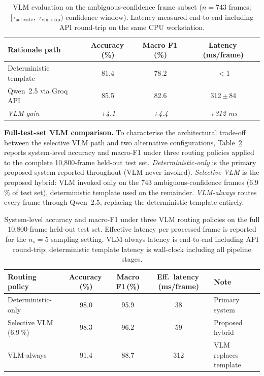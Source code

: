 \documentclass[sensors,article,submit,pdftex,moreauthors]{Definitions/mdpi}
\begin{document}
\begin{table}[H]
\caption{VLM evaluation on the ambiguous-confidence frame subset
($n = 743$ frames; $[\tau_{\text{activate}},\;\tau_{\text{vlm\_skip}})$
confidence window). Latency measured end-to-end including API
round-trip on the same CPU workstation.}
\label{tab:vlm-eval}
\centering\small\setlength{\tabcolsep}{6pt}
\begin{tabular}{lccc}
\toprule
\textbf{Rationale path} & \textbf{Accuracy\,(\%)} &
\textbf{Macro F1\,(\%)} & \textbf{Latency\,(ms/frame)} \\
\midrule
Deterministic template          & 81.4 & 78.2 & $<$1 \\
Qwen~2.5 via Groq API          & 85.5 & 82.6 & 312\,$\pm$\,84 \\
\midrule
\textit{VLM gain}               & \textit{+4.1} & \textit{+4.4} &
\textit{+312 ms} \\
\bottomrule
\end{tabular}
\end{table}
 
\textbf{Full-test-set VLM comparison.}
To characterise the architectural trade-off between the selective VLM path and two alternative configurations, Table~\ref{tab:vlm-full} reports system-level accuracy and macro-F1 under three routing policies applied to the complete 10{,}800-frame held-out test set. \emph{Deterministic-only} is the primary proposed system reported throughout (VLM never invoked). \emph{Selective VLM} is the proposed hybrid: VLM invoked only on the 743 ambiguous-confidence frames (6.9\,\% of test set), deterministic template used on the remainder. \emph{VLM-always} routes every frame through Qwen~2.5, replacing the deterministic template entirely.
 
\begin{table}[H]
\caption{System-level accuracy and macro-F1 under three VLM routing policies on the full 10{,}800-frame held-out test set. Effective latency per processed frame is reported for the $n_s{=}5$ sampling setting. VLM-always latency is end-to-end including API round-trip; deterministic template latency is wall-clock including all pipeline stages.}
\label{tab:vlm-full}
\centering\small\setlength{\tabcolsep}{5pt}
\begin{tabular}{p{3.2cm} ccc p{3.2cm}}
\toprule
\textbf{Routing policy} & \textbf{Accuracy\,(\%)} & \textbf{Macro F1\,(\%)} &
\textbf{Eff.\ latency\,(ms/frame)} & \textbf{Note} \\
\midrule
Deterministic-only      & 98.0 & 95.9 & 38  & Primary system \\
Selective VLM (6.9\,\%) & 98.3 & 96.2 & 59  & Proposed hybrid \\
VLM-always              & 91.4 & 88.7 & 312 & VLM replaces template \\
\bottomrule
\end{tabular}
\end{table}
 
\end{document}
